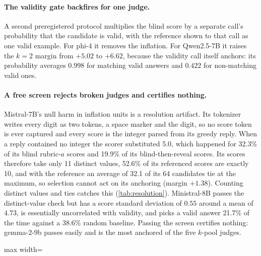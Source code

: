 \paragraph{The validity gate backfires for one judge.}
A second preregistered protocol multiplies the blind score by a separate call's probability that the candidate is valid, with the reference shown to that call as one valid example. For phi-4 it removes the inflation. For Qwen2.5-7B it raises the $k{=}2$ margin from $+5.02$ to $+6.62$, because the validity call itself anchors: its probability averages $0.998$ for matching valid answers and $0.422$ for non-matching valid ones.

\paragraph{A free screen rejects broken judges and certifies nothing.}
Mistral-7B's null harm in inflation units is a resolution artifact. Its tokenizer writes every digit as two tokens, a space marker and the digit, so no score token is ever captured and every score is the integer parsed from its greedy reply. When a reply contained no integer the scorer substituted 5.0, which happened for 32.3\% of its blind rubric-$a$ scores and 19.9\% of its blind-then-reveal scores. Its scores therefore take only 11 distinct values, 52.6\% of its referenced scores are exactly 10, and with the reference an average of 32.1 of its 64 candidates tie at the maximum, so selection cannot act on its anchoring (margin $+1.38$). Counting distinct values and ties catches this (\cref{tab:resolution}). Ministral-8B passes the distinct-value check but has a score standard deviation of $0.55$ around a mean of $4.73$, is essentially uncorrelated with validity, and picks a valid answer 21.7\% of the time against a 38.6\% random baseline. Passing the screen certifies nothing: gemma-2-9b passes easily and is the most anchored of the five $k$-pool judges.

\begin{table}[htbp]
\centering
\caption{Score-resolution screen on the $k$-pool; tie counts and selection accuracy use blind scores.\pre}
\label{tab:resolution}
\footnotesize
\begin{adjustbox}{max width=\linewidth}\end{adjustbox}

\end{table}

\FloatBarrier
